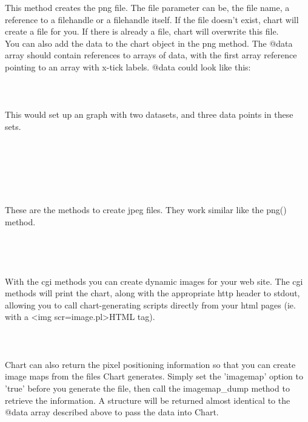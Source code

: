 This method creates the png file. The file parameter can be, the file name, a reference to a filehandle or a filehandle itself. If the file doesn't exist, chart will create a file for you. If there is already a file, chart will overwrite this file.\\
You can also add the data to the chart object in the png method. The @data array should contain references to arrays of data, with the first array reference pointing to an array with x-tick labels. @data could look like this:\\
\\
\\
\\
This would set up an graph with two datasets, and three data points in these sets.\\
\\
\\
 \\
 \\
 \\
\\
These are the methods to create jpeg files. They work similar like the png() method. \\
\\
\\
 \\
 \\
With the cgi methods you can create dynamic images for your web site. The cgi methods will print the chart, along with the appropriate http header to stdout, allowing you to call chart-generating scripts directly from your html pages (ie. with a <img scr=image.pl>HTML tag).\\
\\
\\
 \\ 
Chart can also return the pixel positioning information so that you can create image maps from the files Chart generates. Simply set the 'imagemap' option to 'true' before you generate the file, then call the imagemap\_dump method to retrieve the information. A structure will be returned almost identical to the @data array described above to pass the data into Chart.\\
\\
\\
